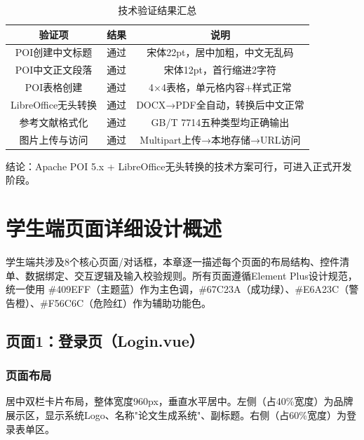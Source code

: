\documentclass{../softeng}
\begin{document}
\begin{table}[htbp]
\centering
\caption{技术验证结果汇总}
\label{tab:verify_result}
\begin{tabular}{|c|c|c|}
\hline
\textbf{验证项} & \textbf{结果} & \textbf{说明} \\
\hline
POI创建中文标题 & 通过 & 宋体22pt，居中加粗，中文无乱码 \\
\hline
POI中文正文段落 & 通过 & 宋体12pt，首行缩进2字符 \\
\hline
POI表格创建 & 通过 & 4×4表格，单元格内容+样式正常 \\
\hline
LibreOffice无头转换 & 通过 & DOCX→PDF全自动，转换后中文正常 \\
\hline
参考文献格式化 & 通过 & GB/T 7714五种类型均正确输出 \\
\hline
图片上传与访问 & 通过 & Multipart上传→本地存储→URL访问 \\
\hline
\end{tabular}
\end{table}

结论：Apache POI 5.x + LibreOffice无头转换的技术方案可行，可进入正式开发阶段。

\section{学生端页面详细设计概述}

学生端共涉及8个核心页面/对话框，本章逐一描述每个页面的布局结构、控件清单、数据绑定、交互逻辑及输入校验规则。所有页面遵循Element Plus设计规范，统一使用 \#409EFF（主题蓝）作为主色调，\#67C23A（成功绿）、\#E6A23C（警告橙）、\#F56C6C（危险红）作为辅助功能色。

\subsection{页面1：登录页（Login.vue）}

\subsubsection{页面布局}
居中双栏卡片布局，整体宽度960px，垂直水平居中。左侧（占40\%宽度）为品牌展示区，显示系统Logo、名称"论文生成系统"、副标题。右侧（占60\%宽度）为登录表单区。
\end{document}
